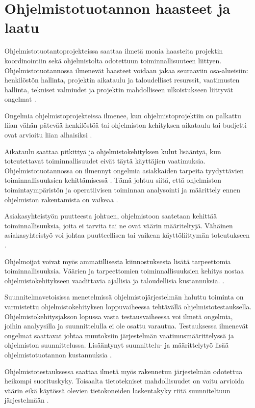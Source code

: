 \documentclass[finnish]{tktltiki2}
\theoremstyle{definition}
\theoremstyle{remark}
\begin{document}
\section{Ohjelmistotuotannon haasteet ja laatu}

Ohjelmistotuotantoprojekteissa saattaa ilmetä monia haasteita projektin koordinointiin sekä ohjelmistolta odotettuun toiminnallisuuteen liittyen. Ohjelmistotuotannossa ilmenevät haasteet voidaan jakaa seuraaviin osa-alueisiin: henkilöstön hallinta, projektin aikataulu ja taloudelliset resurssit, vaatimusten hallinta, tekniset valmiudet ja projektin mahdolliseen ulkoistukseen liittyvät ongelmat \cite{BOE88}.

Ongelmia ohjelmistoprojekteissa ilmenee, kun ohjelmistoprojektiin on palkattu liian vähän pätevää henkilöstöä tai ohjelmiston kehityksen aikataulu tai budjetti ovat arvioitu liian alhaisiksi \cite{BOE88}.

Aikataulu saattaa pitkittyä ja ohjelmistokehityksen kulut lisääntyä, kun toteutettavat toiminnallisuudet eivät täytä käyttäjien vaatimuksia. Ohjelmistotuotannossa on ilmennyt ongelmia asiakkaiden tarpeita tyydyttävien toiminnallisuuksien kehittämisessä \cite{BEC99}. Tämä johtuu siitä, että ohjelmiston toimintaympäristön ja operatiivisen toiminnan analysointi ja määrittely ennen ohjelmiston rakentamista on vaikeaa \cite{BOE88}.

Asiakasyhteistyön puutteesta johtuen, ohjelmistoon saatetaan kehittää toiminnallisuuksia, joita ei tarvita tai ne ovat väärin määriteltyjä. Vähäinen asiakasyhteistyö voi johtaa puutteellisen tai vaikean käyttöliittymän toteutukseen \cite{BOE88}.

Ohjelmoijat voivat myös ammatillisesta kiinnostuksesta lisätä tarpeettomia toiminnallisuuksia. Väärien ja tarpeettomien toiminnallisuuksien kehitys nostaa ohjelmistokehitykseen vaadittavia ajallisia ja taloudellisia kustannuksia. \cite{BOE88}.

Suunnitelmavetoisissa menetelmissä ohjelmistojärjestelmän haluttu toiminta on varmistettu ohjelmistokehityksen loppuvaiheessa tehtävällä ohjelmistotestauksella. Ohjelmistokehitysjakson lopussa vasta testausvaiheessa voi ilmetä ongelmia, joihin analyysilla ja suunnittelulla ei ole osattu varautua. Testauksessa ilmenevät ongelmat saattavat johtaa muutoksiin järjestelmän vaatimusmäärittelyssä ja ohjelmiston suunnittelussa. Lisääntynyt suunnittelu- ja määrittelytyö lisää ohjelmistotuotannon kustannuksia \cite{ROY70}.

Ohjelmistotestauksessa saattaa ilmetä myös rakennetun järjestelmän odotettua heikompi suorituskyky. Toisaalta tietotekniset mahdollisuudet on voitu arvioida väärin eikä käytössä olevien tietokoneiden laskentakyky riitä suunniteltuun järjestelmään \cite{BOE88}.
　
\end{document}
